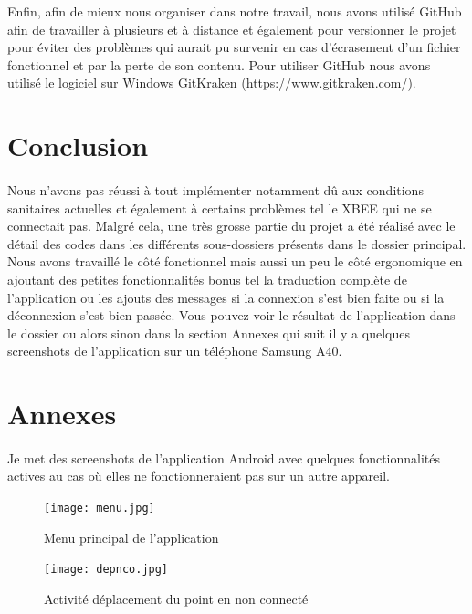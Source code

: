 \documentclass[a4paper,12pt]{report}
\begin{document}
			Enfin, afin de mieux nous organiser dans notre travail, nous avons utilisé GitHub afin de travailler à plusieurs et à distance et également pour versionner le projet pour éviter des problèmes qui aurait pu survenir en cas d'écrasement d'un fichier fonctionnel et par la perte de son contenu. Pour utiliser GitHub nous avons utilisé le logiciel sur Windows GitKraken (https://www.gitkraken.com/).
	
	\section{Conclusion}
		\paragraph*{}
		Nous n'avons pas réussi à tout implémenter notamment dû aux conditions sanitaires actuelles et également à certains problèmes tel le XBEE qui ne se connectait pas. Malgré cela, une très grosse partie du projet a été réalisé avec le détail des codes dans les différents sous-dossiers présents dans le dossier principal. Nous avons travaillé le côté fonctionnel mais aussi un peu le côté ergonomique en ajoutant des petites fonctionnalités bonus tel la traduction complète de l'application ou les ajouts des messages si la connexion s'est bien faite ou si la déconnexion s'est bien passée. Vous pouvez voir le résultat de l'application dans le dossier ou alors sinon dans la section Annexes qui suit il y a quelques screenshots de l'application sur un téléphone Samsung A40.
	
	\section{Annexes}
		\paragraph*{}
		Je met des screenshots de l'application Android avec quelques fonctionnalités actives au cas où elles ne fonctionneraient pas sur un autre appareil.
		
		\begin{figure}[H]
			\centering
				\texttt{[image: menu.jpg]}
				\caption{Menu principal de l'application}
		\end{figure}
		
		\begin{figure}[H]
			\centering
				\texttt{[image: depnco.jpg]}
				\caption{Activité déplacement du point en non connecté}
		\end{figure}
		
\end{document}
